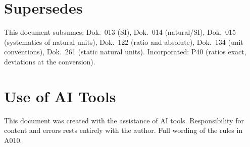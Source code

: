 \section{Supersedes}

This document subsumes: Dok.~013 (SI), Dok.~014 (natural/SI), Dok.~015
(systematics of natural units), Dok.~122 (ratio and absolute), Dok.~134
(unit conventions), Dok.~261 (static natural units). Incorporated: P40
(ratios exact, deviations at the conversion).

\section{Use of AI Tools}

This document was created with the assistance of AI tools.
Responsibility for content and errors rests entirely with the author.
Full wording of the rules in A010.
